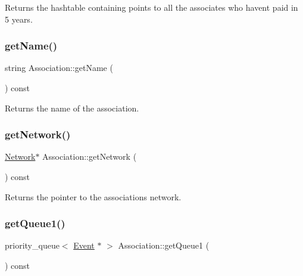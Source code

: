 Returns the hashtable containing points to all the associates who haven\textquotesingle{}t paid in 5 years. 

\mbox{\label{classAssociation_ab9b849706f996d80ed3439d43d06a958}} 
\subsubsection{\texorpdfstring{get\+Name()}{getName()}}
{\footnotesize\ttfamily string Association\+::get\+Name (\begin{DoxyParamCaption}{ }\end{DoxyParamCaption}) const}



Returns the name of the association. 

\mbox{\label{classAssociation_aa937fe1fcf8fb9f16a34ece38fef73d3}} 
\subsubsection{\texorpdfstring{get\+Network()}{getNetwork()}}
{\footnotesize\ttfamily \mbox{\hyperlink{classNetwork}{Network}}$\ast$ Association\+::get\+Network (\begin{DoxyParamCaption}{ }\end{DoxyParamCaption}) const}



Returns the pointer to the association\textquotesingle{}s network. 

\mbox{\label{classAssociation_a595bd9c5abaf1ceaa62ac8fb70d359c6}} 
\subsubsection{\texorpdfstring{get\+Queue1()}{getQueue1()}}
{\footnotesize\ttfamily priority\+\_\+queue$<$ \mbox{\hyperlink{classEvent}{Event}} $\ast$ $>$ Association\+::get\+Queue1 (\begin{DoxyParamCaption}{ }\end{DoxyParamCaption}) const}



